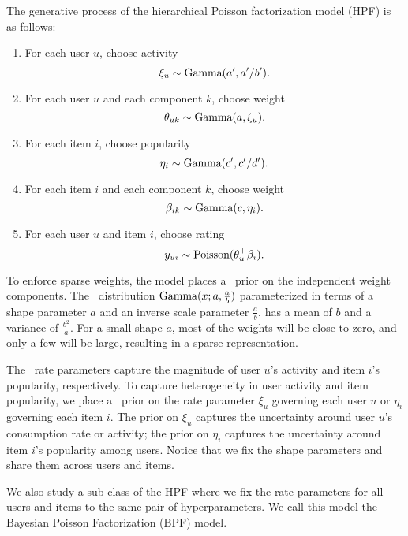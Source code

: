 The generative process of the hierarchical Poisson factorization model
(HPF) is as follows:
\begin{enumerate}
\item For each user $u$, choose activity
  \begin{equation*}
    \xi_u \sim \textrm{Gamma}(a', a'/b').
  \end{equation*}
\item For each user $u$ and each component $k$, choose weight
  \begin{equation*}
    \theta_{uk} \sim \textrm{Gamma}(a, \xi_u).
  \end{equation*}
\item For each item $i$, choose popularity
  \begin{equation*}
    \eta_i \sim \textrm{Gamma}(c', c'/d').
  \end{equation*}
\item For each item $i$ and each component $k$, choose weight
  \begin{equation*}
    \beta_{ik} \sim \textrm{Gamma}(c, \eta_i).
  \end{equation*}
\item For each user $u$ and item $i$, choose rating
  \begin{equation*}
    y_{ui} \sim \textrm{Poisson}(\theta_u^\top \beta_i).
  \end{equation*}
\end{enumerate}
To enforce sparse weights, the model places a \gam~prior on the
independent weight components. The \gam~distribution
$\textrm{Gamma}(x;a,\frac{a}{b})$ parameterized in terms of a shape parameter
$a$ and an inverse scale parameter $\frac{a}{b}$, has a mean of $b$
and a variance of $\frac{b^2}{a}$. For a small shape $a$, most of the
weights will be close to zero, and only a few will be large, resulting
in a sparse representation.

The \gam~rate parameters capture the magnitude of user $u$'s activity
and item $i$'s popularity, respectively.  To capture heterogeneity in
user activity and item popularity, we place a \gam~prior on the rate
parameter $\xi_u$ governing each user $u$ or $\eta_i$ governing each
item $i$. The prior on $\xi_u$ captures the uncertainty around user
$u$'s consumption rate or activity; the prior on $\eta_i$ captures the
uncertainty around item $i$'s popularity among users. Notice that we
fix the shape parameters and share them across users and items.


We also study a sub-class of the HPF where we fix the rate parameters
for all users and items to the same pair of hyperparameters. We call
this model the Bayesian Poisson Factorization (BPF) model.

